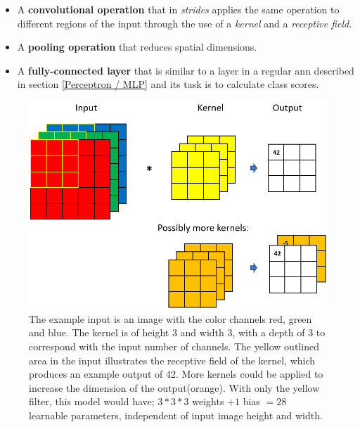     \begin{itemize}
        \item A \textbf{convolutional operation} that in \textit{strides} applies the same operation to different regions of the input through the use of a \textit{kernel} and a \textit{receptive field}.
        \item A \textbf{pooling operation} that reduces spatial dimensions.
        \item A \textbf{fully-connected layer} that is similar to a layer in a regular \gls{ann} described in section \ref{Perceptron / MLP} and its task is to calculate class scores.
     \end{itemize}
     
    \begin{figure}[H]
        \centering
        \includegraphics[scale=0.4]{figures/convolution.png}
        \caption[Convolutional operation example]{The example input is an image with the color channels red, green and blue. The kernel is of height 3 and width 3, with a depth of 3 to correspond with the input number of channels. The yellow outlined area in the input illustrates the receptive field of the kernel, which produces an example output of 42. More kernels could be applied to increase the dimension of the output(orange). With only the yellow filter, this model would have; $3*3*3$ weights $+ 1$ bias $= 28$ learnable parameters, independent of input image height and width.}
      	\medskip 
        \label{convolutional_high_level_fig}
    \end{figure}
    

